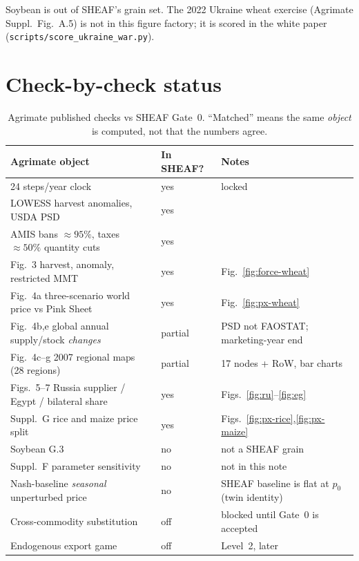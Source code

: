 \documentclass[11pt,a4paper]{article}
\begin{document}
Soybean is out of SHEAF's grain set. The 2022 Ukraine wheat exercise
(Agrimate Suppl.\ Fig.~A.5) is not in this figure factory; it is scored in
the white paper (\texttt{scripts/score\_ukraine\_war.py}).

\section{Check-by-check status}

\begin{table}[H]
\centering
\caption{Agrimate published checks vs SHEAF Gate~0. ``Matched'' means the same
\emph{object} is computed, not that the numbers agree.}
\small
\begin{tabularx}{\textwidth}{l l X}
\toprule
Agrimate object & In SHEAF? & Notes \\
\midrule
24 steps/year clock & yes & locked \\
LOWESS harvest anomalies, USDA PSD & yes & \\
AMIS bans $\approx 95\%$, taxes $\approx 50\%$ quantity cuts & yes & \\
Fig.~3 harvest, anomaly, restricted MMT & yes & Fig.~\ref{fig:force-wheat} \\
Fig.~4a three-scenario world price vs Pink Sheet & yes & Fig.~\ref{fig:px-wheat} \\
Fig.~4b,e global annual supply/stock \emph{changes} & partial & PSD not FAOSTAT; marketing-year end \\
Fig.~4c--g 2007 regional maps (28 regions) & partial & 17 nodes + RoW, bar charts \\
Figs.~5--7 Russia supplier / Egypt / bilateral share & yes & Figs.~\ref{fig:ru}--\ref{fig:eg} \\
Suppl.\ G rice and maize price split & yes & Figs.~\ref{fig:px-rice},\ref{fig:px-maize} \\
Soybean G.3 & no & not a SHEAF grain \\
Suppl.\ F parameter sensitivity & no & not in this note \\
Nash-baseline \emph{seasonal} unperturbed price & no & SHEAF baseline is flat at $p_0$ (twin identity) \\
Cross-commodity substitution & off & blocked until Gate~0 is accepted \\
Endogenous export game & off & Level~2, later \\
\bottomrule
\end{tabularx}
\end{table}
\end{document}
